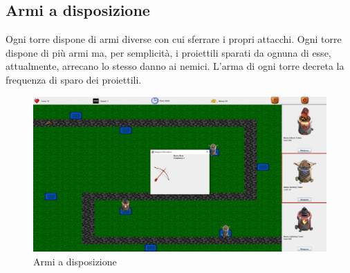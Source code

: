 \documentclass[a4paper,12pt]{report}
\begin{document}
\vspace{100mm}

\subsection{Armi a disposizione}
Ogni torre dispone di armi diverse con cui sferrare i propri attacchi.
Ogni torre dispone di più armi ma, per semplicità, i proiettili sparati da ognuna di esse, attualmente, arrecano lo stesso danno ai nemici. 
L'arma di ogni torre decreta la frequenza di sparo dei proiettili.

\begin{figure}[H]
    \centering
    \includegraphics[width=\linewidth]{weapon}
    \caption{Armi a disposizione}
    \label{fig:weapon}
\end{figure}
\end{document}
